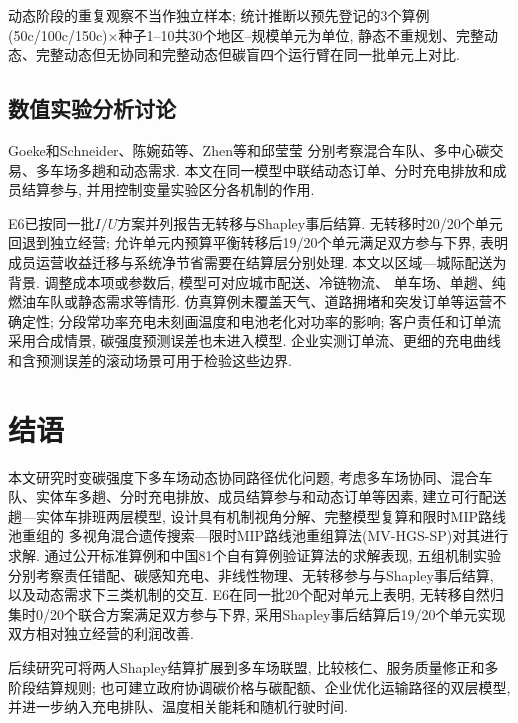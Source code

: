 \documentclass{setp-new}
\begin{document}
动态阶段的重复观察不当作独立样本;
统计推断以预先登记的3个算例(50c/100c/150c)$\times$种子1--10共30个地区--规模单元为单位,
静态不重规划、完整动态、完整动态但无协同和完整动态但碳盲四个运行臂在同一批单元上对比.

\subsection{数值实验分析讨论}

Goeke和Schneider\cite{ref:27}、陈婉茹等\cite{ref:23}、Zhen等\cite{ref:44}和邱莹莹\cite{ref:71}
分别考察混合车队、多中心碳交易、多车场多趟和动态需求.
本文在同一模型中联结动态订单、分时充电排放和成员结算参与,
并用控制变量实验区分各机制的作用.

E6已按同一批$I/U$方案并列报告无转移与Shapley事后结算.
无转移时20/20个单元回退到独立经营;
允许单元内预算平衡转移后19/20个单元满足双方参与下界,
表明成员运营收益迁移与系统净节省需要在结算层分别处理.
本文以区域—城际配送为背景. 调整成本项或参数后, 模型可对应城市配送、冷链物流、
单车场、单趟、纯燃油车队或静态需求等情形.
仿真算例未覆盖天气、道路拥堵和突发订单等运营不确定性;
分段常功率充电未刻画温度和电池老化对功率的影响;
客户责任和订单流采用合成情景, 碳强度预测误差也未进入模型.
企业实测订单流、更细的充电曲线和含预测误差的滚动场景可用于检验这些边界.

\section{结语}

本文研究时变碳强度下多车场动态协同路径优化问题,
考虑多车场协同、混合车队、实体车多趟、分时充电排放、成员结算参与和动态订单等因素,
建立可行配送趟—实体车排班两层模型,
设计具有机制视角分解、完整模型复算和限时MIP路线池重组的
多视角混合遗传搜索—限时MIP路线池重组算法(MV-HGS-SP)对其进行求解.
通过公开标准算例和中国81个自有算例验证算法的求解表现,
五组机制实验分别考察责任错配、碳感知充电、非线性物理、无转移参与与Shapley事后结算,
以及动态需求下三类机制的交互.
E6在同一批20个配对单元上表明, 无转移自然归集时0/20个联合方案满足双方参与下界,
采用Shapley事后结算后19/20个单元实现双方相对独立经营的利润改善.

后续研究可将两人Shapley结算扩展到多车场联盟, 比较核仁、服务质量修正和多阶段结算规则;
也可建立政府协调碳价格与碳配额、企业优化运输路径的双层模型,
并进一步纳入充电排队、温度相关能耗和随机行驶时间.
\end{document}
